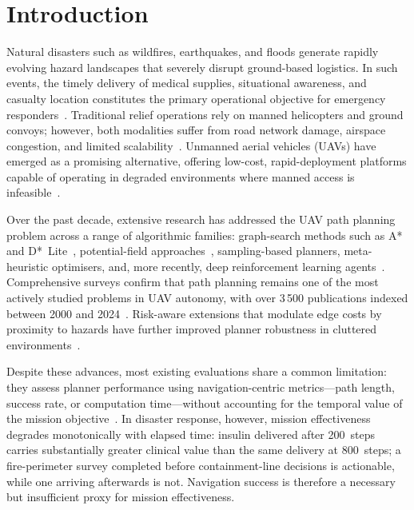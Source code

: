 \documentclass[drones,article,submit,moreauthors]{Definitions/mdpi}
\begin{document}
\section{Introduction}\label{sec:intro}

Natural disasters such as wildfires, earthquakes, and floods generate
rapidly evolving hazard landscapes that severely disrupt ground-based
logistics. In such events, the timely delivery of medical supplies,
situational awareness, and casualty location constitutes the primary
operational objective for emergency
responders~\cite{Erdelj2017,Yucesoy2025}. Traditional relief operations
rely on manned helicopters and ground convoys; however, both modalities
suffer from road network damage, airspace congestion, and limited
scalability~\cite{Rahim2025}. Unmanned aerial vehicles (UAVs) have
emerged as a promising alternative, offering low-cost, rapid-deployment
platforms capable of operating in degraded environments where manned
access is infeasible~\cite{LiWildfire2024,Dradoum2025}.

Over the past decade, extensive research has addressed the UAV path
planning problem across a range of algorithmic families: graph-search
methods such as A*~\cite{Hart1968} and D*~Lite~\cite{Koenig2002},
potential-field approaches~\cite{Khatib1986}, sampling-based planners,
meta-heuristic optimisers, and, more recently, deep reinforcement
learning agents~\cite{Meng2025,Aggarwal2020,Patra2025}. Comprehensive
surveys confirm that path planning remains one of the most actively
studied problems in UAV autonomy, with over 3\,500 publications indexed
between 2000 and 2024~\cite{Bouzid2025,SanchezIbanez2025}. Risk-aware
extensions that modulate edge costs by proximity to hazards have further
improved planner robustness in cluttered
environments~\cite{Zhou2025,Melissaris2025,Karaagac2025}.

Despite these advances, most existing evaluations share a common
limitation: they assess planner performance using navigation-centric
metrics---path length, success rate, or computation time---without
accounting for the temporal value of the mission
objective~\cite{Chen2024fire}. In disaster response, however, mission
effectiveness degrades monotonically with elapsed time: insulin delivered
after 200~steps carries substantially greater clinical value than the
same delivery at 800~steps; a fire-perimeter survey completed before
containment-line decisions is actionable, while one arriving afterwards
is not. Navigation success is therefore a necessary but insufficient
proxy for mission effectiveness.
\end{document}
